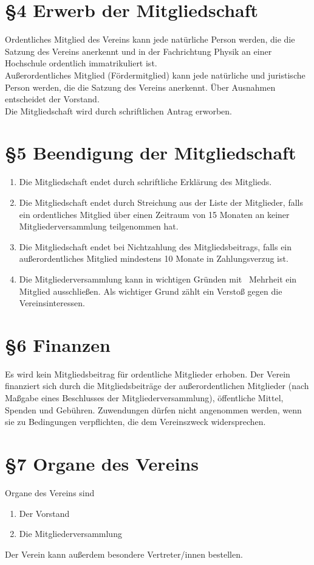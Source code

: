 \documentclass[ngerman]{article}
\begin{document}
\section*{§4 Erwerb der Mitgliedschaft}
Ordentliches Mitglied des Vereins kann jede natürliche Person werden, die die Satzung des Vereins anerkennt und in der Fachrichtung Physik an einer Hochschule ordentlich immatrikuliert ist.\\
Außerordentliches Mitglied (\glqq Fördermitglied\grqq) kann jede natürliche und juristische Person werden, die die Satzung des Vereins anerkennt.
Über Ausnahmen entscheidet der Vorstand.\\
Die Mitgliedschaft wird durch schriftlichen Antrag erworben.


\section*{§5 Beendigung der Mitgliedschaft}
\begin{enumerate}
 \item Die Mitgliedschaft endet durch schriftliche Erklärung des Mitglieds.
 \item Die Mitgliedschaft endet durch Streichung aus der Liste der Mitglieder, falls ein ordentliches Mitglied über einen Zeitraum von 15 Monaten an keiner Mitgliederversammlung teilgenommen hat.
 \item Die Mitgliedschaft endet bei Nichtzahlung des Mitgliedsbeitrags, falls ein außerordentliches Mitglied mindestens 10 Monate in Zahlungsverzug ist.
 \item Die Mitgliederversammlung kann in wichtigen Gründen mit \ Mehrheit ein Mitglied ausschließen. Als wichtiger Grund zählt ein Verstoß gegen die Vereinsinteressen.
\end{enumerate}


\section*{§6 Finanzen}
Es wird kein Mitgliedsbeitrag für ordentliche Mitglieder erhoben. Der Verein finanziert sich durch die Mitgliedsbeiträge der außerordentlichen Mitglieder (nach Maßgabe eines Beschlusses der Mitgliederversammlung), öffentliche Mittel, Spenden und Gebühren. Zuwendungen dürfen nicht angenommen werden, wenn sie zu Bedingungen verpflichten, die dem Vereinszweck widersprechen.


\section*{§7 Organe des Vereins}
Organe des Vereins sind
\begin{enumerate}
 \item Der Vorstand
 \item Die Mitgliederversammlung
\end{enumerate}
Der Verein kann außerdem besondere Vertreter/innen bestellen.
\end{document}
